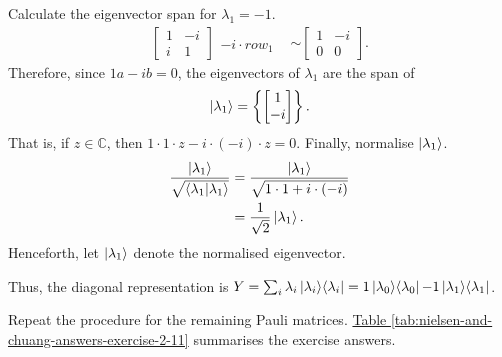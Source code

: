 Calculate the eigenvector span for $\lambda_1 = -1$.
\begin{align}
    \left[ \begin{matrix}
        1 & -i \\ i & 1
    \end{matrix} \right]
    \begin{matrix}
        ~ \\
        -i \cdot row_1
    \end{matrix}
    &\sim
    \left[ \begin{matrix}
        1 & -i \\ 0 & 0
    \end{matrix} \right].
\end{align}
Therefore, since $1a -ib = 0$,
the eigenvectors of $\lambda_1$ are the span of
\begin{align}
    \ket{\lambda_1} = \left\{ \left[ \begin{matrix} 1 \\ -i \end{matrix} \right] \right\}.
\end{align}
That is, if $z \in \mathbb{C}$, then $1 \cdot 1 \cdot z - i \cdot (-i) \cdot z = 0$.
Finally, normalise $\ket{\lambda_1}$.
\begin{align}
    \frac{\ket{\lambda_1}}{\sqrt{\mathop{\mathinner{ \langle{\lambda_1}|{\lambda_1}\rangle}}}} &=
    \frac{\ket{\lambda_1}}{\sqrt{1\cdot 1 + i \cdot (-i)}} \\
    &= \frac{1}{\sqrt2} \ket{\lambda_1}.
\end{align}
Henceforth, let $\ket{\lambda_1}$ denote the normalised eigenvector.

Thus, the diagonal representation is
$Y = \sum_i \lambda_i \mathop{\mathinner{ |{\lambda_i}\rangle \langle{\lambda_i}|}} = 
1 \mathop{\mathinner{ |{\lambda_0}\rangle \langle{\lambda_0}|}} - 1 \mathop{\mathinner{ |{\lambda_1}\rangle \langle{\lambda_1}|}}$.

Repeat the procedure for the remaining Pauli matrices.
\hyperref[tab:nielsen-and-chuang-answers-exercise-2-11]{
    Table \ref{tab:nielsen-and-chuang-answers-exercise-2-11}}
summarises the exercise answers.

